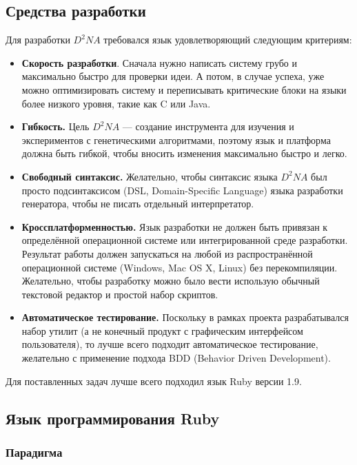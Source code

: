 \documentclass[a4paper,14pt]{extarticle}
\begin{document}
\subsection{Средства разработки}
Для разработки $D^2NA$ требовался язык удовлетворяющий следующим критериям:
\begin{itemize}
  \item {\bf Скорость разработки}. Сначала нужно написать систему грубо и
        максимально быстро для проверки идеи. А потом, в случае успеха, уже
        можно оптимизировать систему и переписывать критические блоки на языки
        более низкого уровня, такие как C или Java.
  \item {\bf Гибкость.} Цель $D^2NA$ — создание инструмента для изучения и
        экспериментов с генетическими алгоритмами, поэтому язык и платформа
        должна быть гибкой, чтобы вносить изменения максимально быстро и легко.
  \item {\bf Свободный синтаксис.} Желательно, чтобы синтаксис языка $D^2NA$ был
        просто подсинтаксисом (DSL, Domain-Specific Language) языка разработки
        генератора, чтобы не писать отдельный интерпретатор.
  \item {\bf Кроссплатформенностью.} Язык разработки не должен быть привязан к
        определённой операционной системе или интегрированной среде разработки.
        Результат работы должен запускаться на любой из распространённой
        операционной системе (Windows, Mac OS X, Linux) без перекомпиляции.
        Желательно, чтобы разработку можно было вести использую обычный
        текстовой редактор и простой набор скриптов.
  \item {\bf Автоматическое тестирование.} Поскольку в рамках проекта
        разрабатывался набор утилит (а не конечный продукт с графическим
        интерфейсом пользователя), то лучше всего подходит автоматическое
        тестирование, желательно с применение подхода BDD (Behavior Driven
        Development).
\end{itemize}

Для поставленных задач лучше всего подходил язык Ruby версии 1.9.

\subsection{Язык программирования Ruby}

\subsubsection{Парадигма}
\end{document}
